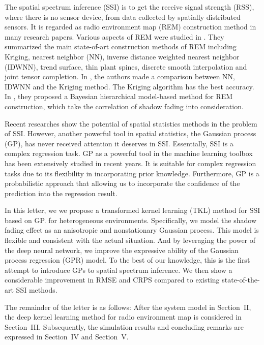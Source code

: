 \documentclass[journal, oneside, twocolumn]{IEEEtran}
\begin{document}
The spatial spectrum inference (SSI) is to get the receive signal strength (RSS), where there is no sensor device, from data collected by spatially distributed sensors. It is regarded as radio environment map (REM) construction method in many research papers\cite{Phillips2012, Pesko2014, Sato2017, Li2018, Han2019, Katagiri2020, Xu2021}. Various aspects of REM were studied in \cite{Li2018}. They summarized the main state-of-art construction methods of REM including Kriging, nearest neighbor (NN), inverse distance weighted nearest neighbor (IDWNN), trend surface, thin plant spines, discrete smooth interpolation and joint tensor completion. In \cite{Han2019}, the authors made a comparison between NN, IDWNN and the Kriging method. The Kriging algorithm has the best accuracy. In \cite{Xu2021}, they proposed a Bayesian hierarchical model-based method for REM construction, which take the correlation of shadow fading into consideration. 

Recent researches show the potential of spatial statistics methods in the problem of SSI. However, another powerful tool in spatial statistics, the Gaussian process (GP), has never received attention it deserves in SSI. Essentially, SSI is a complex regression task. GP as a powerful tool in the machine learning toolbox \cite{Rasmussen2006} has been extensively studied in recent years\cite{Damianou2013, Wilson2013,Duvenaud2014a,Salimbeni2017a, Lee2018,Wilson2019}. It is suitable for complex regression tasks due to its flexibility in incorporating prior knowledge. Furthermore, GP is a probabilistic approach that allowing us to incorporate the confidence of the prediction into the regression result.

In this letter, we we propose a transformed kernel learning (TKL) method for SSI based on GP. for heterogeneous environments. Specifically, we model the shadow fading effect as an anisotropic and nonstationary Gaussian process. This model is flexible and consistent with the actual situation. And by leveraging the power of the deep neural network, we improve the expressive ability of the Gaussian process regression (GPR) model. To the best of our knowledge, this is the first attempt to introduce GPs to spatial spectrum inference.
We then show a considerable improvement in RMSE and CRPS compared to existing state-of-the-art SSI methods.

The remainder of the letter is as follows: After the system model in Section~II, the deep kernel learning method for radio environment map is considered in Section~III. Subsequently, the simulation results and concluding remarks are expressed in Section~IV and Section~V.
\end{document}
